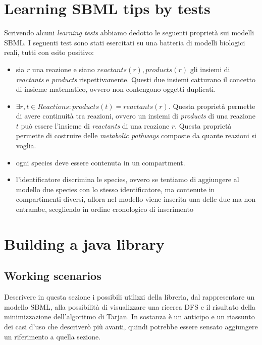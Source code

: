 \section{Learning SBML tips by tests}

Scrivendo alcuni \emph{learning tests} abbiamo dedotto le seguenti
propriet\`a sui modelli SBML. I seguenti test sono stati esercitati su
una batteria di modelli biologici reali, tutti con esito positivo:
\begin{itemize}
\item sia $r$ una reazione e siano $reactants(r), products(r)$ gli
  insiemi di \emph{reactants} e \emph{products}
  rispettivamente. Questi due insiemi catturano il concetto di insieme
  matematico, ovvero non contengono oggetti duplicati.
\item $\exists r,t \in Reactions: products(t) = reactants(r)$. Questa
  propriet\`a permette di avere continuit\`a tra reazioni, ovvero un
  insiemi di \emph{products} di una reazione $t$ pu\`o essere
  l'insieme di \emph{reactants} di una reazione $r$. Questa
  propriet\`a permette di costruire delle \emph{metabolic pathways}
  composte da quante reazioni si voglia.
\item ogni species deve essere contenuta in un compartment.
\item l'identificatore discrimina le species, ovvero se tentiamo di
  aggiungere al modello due species con lo stesso identificatore, ma
  contenute in compartimenti diversi, allora nel modello viene
  inserita una delle due ma non entrambe, scegliendo in ordine
  cronologico di inserimento
\end{itemize}

\section{Building a java library}


\subsection{Working scenarios}
Descrivere in questa sezione i possibili utilizzi della libreria, dal
rappresentare un modello SBML, alla possibilit\`a di visualizzare una
ricerca DFS e il risultato della minimizzazione dell'algoritmo di
Tarjan. In sostanza \`e un anticipo e un riassunto dei casi d'uso che
descriver\`o pi\`u avanti, quindi potrebbe essere sensato aggiungere
un riferimento a quella sezione.